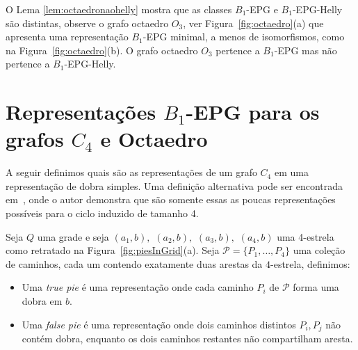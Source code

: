 O Lema \ref{lem:octaedronaohelly} mostra que as classes  $ B_1$-EPG e $ B_1$-EPG-Helly são distintas, observe o grafo octaedro $ O_3$, ver Figura~\ref{fig:octaedro}(a) que apresenta uma representação  $B_1$-EPG minimal, a menos de isomorfismos, como na Figura~\ref{fig:octaedro}(b). O grafo octaedro  $ O_3 $ pertence a $ B_1$-EPG mas não pertence a $B_1$-EPG-Helly.





\section{Representações $B_1$-EPG para os grafos $C_4$ e Octaedro}

A seguir definimos quais são as representações de um grafo $C_4$ em uma representação de dobra simples. Uma definição alternativa pode ser encontrada em~\cite{golumbic2009}, onde o autor demonstra que são somente essas as poucas representações possíveis para o ciclo induzido de tamanho 4.



\begin{definition} \label{defi:tortasFrame}

Seja $ Q $ uma grade e seja $ (a_1, b),$ $(a_2, b),$ $(a_3, b),$ $(a_4, b)$ uma 4-estrela como retratado na Figura~\ref{fig:piesInGrid}(a). Seja  $ \mathcal{P} = \{P_1, \dots , P_4\}$ uma coleção de caminhos, cada um contendo exatamente duas arestas da $4$-estrela, definimos:

\begin{itemize}
\item Uma \emph{true pie} é uma representação onde cada caminho $P_i$ de $ \mathcal{P} $ forma uma dobra em $b$.

\item Uma \emph {false pie} é uma representação onde dois caminhos distintos $P_i, P_j$  não contém dobra, enquanto os dois caminhos restantes não compartilham aresta. 




\end{itemize}
\end{definition}

